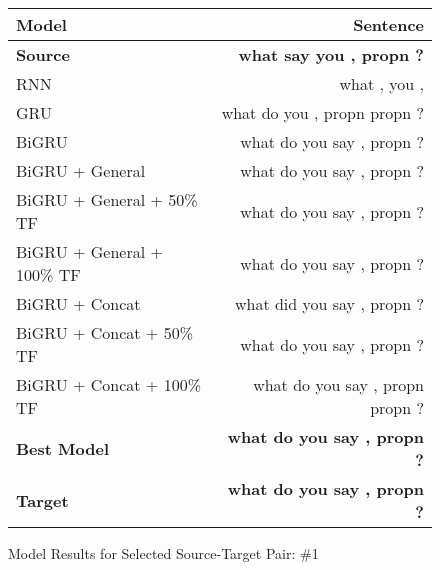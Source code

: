 \documentclass[twoside,twocolumn]{article}
\begin{document}
\begin{figure*}
    \centering
    \begin{tabular}{ |l|r| }
        \hline
        \textbf{Model}
          & \textbf{Sentence} \\
        \hline
        \textbf{Source} & \textbf{what say you , propn ?} \\ \hline
        RNN & what , you , \\ \hline
        GRU & what do you , propn propn ? \\ \hline
        BiGRU & what do you say , propn ? \\ \hline
        BiGRU + General & what do you say , propn ? \\ \hline
        BiGRU + General + 50\% TF & what do you say , propn ? \\ \hline
        BiGRU + General + 100\% TF & what do you say , propn ? \\ \hline
        BiGRU + Concat & what did you say , propn ? \\ \hline
        BiGRU + Concat + 50\% TF & what do you say , propn ? \\ \hline
        BiGRU + Concat + 100\% TF & what do you say , propn propn ? \\ \hline
        \textbf{Best Model} & \textbf{what do you say , propn ?} \\ \hline
        \textbf{Target} & \textbf{what do you say , propn ?} \\ \hline
    \end{tabular}

    \caption{Model Results for Selected Source-Target Pair: \#1}
    \label{fig:model-results}
\end{figure*}
\end{document}
